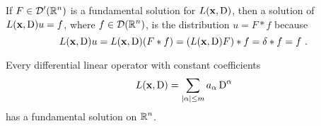 \begin{rmk}
If $\displaystyle F\in \mathcal{D}'(\mathbb{R}^n)$ is a fundamental solution for
$L(\mathbf{x},\operatorname{D})$, then a solution of $L(\mathbf{x},\operatorname{D})u = f$, where
$\displaystyle f \in \mathcal{D}(\mathbb{R}^n)$, is the 
distribution $u = F \ast f$ because
\[
L(\mathbf{x},\operatorname{D}) u = L(\mathbf{x},\operatorname{D})(F \ast f)
= (L(\mathbf{x},\operatorname{D}) F) \ast f = \delta \ast f = f \ .
\]
\end{rmk}

\begin{theorem} \label{malgr_Ehr}
Every differential linear operator with constant coefficients
\begin{equation} \label{distr_lPDE4}
L(\mathbf{x},\operatorname{D}) = \sum_{|\alpha|\leq m} a_\alpha \operatorname{D}^\alpha
\end{equation}
has a fundamental solution on $\displaystyle \mathbb{R}^n$.
\end{theorem}

